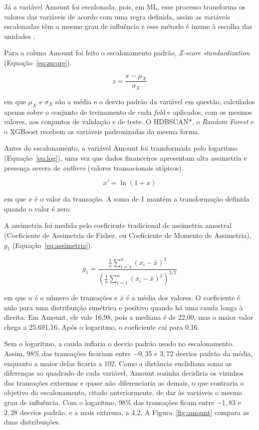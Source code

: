 \documentclass{uflamon}          %
\begin{document}
Já a variável Amount foi escalonada, pois, em ML, esse processo transforma os valores das variáveis de acordo com uma regra definida, assim as variáveis escalonadas têm o mesmo grau de influência e esse método é imune à escolha das unidades \cite{huang2015}.

Para a coluna Amount foi feito o escalonamento padrão, \textit{Z-score standardization} (Equação~\ref{eq:zscore}).

\begin{equation}
    z = \frac{x - \mu_X}{\sigma_X}
    \label{eq:zscore}
\end{equation}

em que $\mu_X$ e $\sigma_X$ são a média e o desvio padrão da variável em questão, calculados apenas sobre o conjunto de treinamento de cada \textit{fold} e aplicados, com os mesmos valores, aos conjuntos de validação e de teste. O HDBSCAN*, o \textit{Random Forest} e o XGBoost recebem as variáveis padronizadas da mesma forma.

Antes do escalonamento, a variável Amount foi transformada pelo logaritmo (Equação~\ref{eq:log}), uma vez que dados financeiros apresentam alta assimetria e presença severa de \textit{outliers} (valores transacionais atípicos).

\begin{equation}
    x' = \ln(1 + x)
    \label{eq:log}
\end{equation}

em que $x$ é o valor da transação. A soma de 1 mantém a transformação definida quando o valor é zero.

A assimetria foi medida pelo coeficiente tradicional de assimetria amostral (Coeficiente de Assimetria de Fisher, ou Coeficiente de Momento de Assimetria), $g_1$ \cite{joanes1998} (Equação~\ref{eq:assimetria}).

\begin{equation}
    g_1 = \frac{\frac{1}{n}\sum_{i=1}^{n}(x_i - \bar{x})^3}{\left(\frac{1}{n}\sum_{i=1}^{n}(x_i - \bar{x})^2\right)^{3/2}}
    \label{eq:assimetria}
\end{equation}

em que $n$ é o número de transações e $\bar{x}$ é a média dos valores. O coeficiente é nulo para uma distribuição simétrica e positivo quando há uma cauda longa à direita. Em Amount, ele vale 16,98, pois a mediana é de 22,00, mas o maior valor chega a 25.691,16. Após o logaritmo, o coeficiente cai para 0,16.

Sem o logaritmo, a cauda inflaria o desvio padrão usado no escalonamento. Assim, 98\% das transações ficariam entre $-0{,}35$ e $3{,}72$ desvios padrão da média, enquanto a maior delas ficaria a 102. Como a distância euclidiana soma as diferenças ao quadrado de cada variável, Amount sozinha decidiria os vizinhos das transações extremas e quase não diferenciaria as demais, o que contraria o objetivo do escalonamento, citado anteriormente, de dar às variáveis o mesmo grau de influência. Com o logaritmo, 98\% das transações ficam entre $-1{,}83$ e $2{,}28$ desvios padrão, e a mais extrema, a 4,2. A Figura~\ref{fig:amount} compara as duas distribuições.
\end{document}
